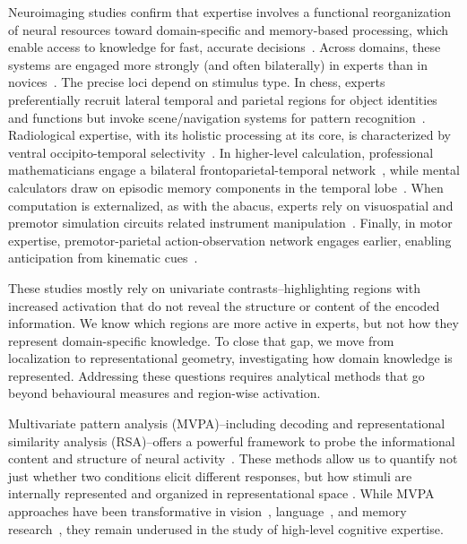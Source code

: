 \documentclass[preprint,12pt]{elsarticle}
\begin{document}
Neuroimaging studies confirm that expertise involves a functional reorganization of neural resources toward domain-specific and memory-based processing, which enable access to knowledge for fast, accurate decisions~\cite{bilalic2017neuroscience,williams2025neural,guida2013functional}. Across domains, these systems are engaged more strongly (and often bilaterally) in experts than in novices~\cite{bilalic2018double}. The precise loci depend on stimulus type. In chess, experts preferentially recruit lateral temporal and parietal regions for object identities and functions but invoke scene/navigation systems for pattern recognition~\cite{krawczyk2011neural,bilalic_mechanisms_2010,bilalic2011takes,bilalic2012expertise,bartlett_expertise_2013,langner2019network}. Radiological expertise, with its holistic processing at its core, is characterized by ventral occipito-temporal selectivity~\cite{harley2009engagement,bilalic_revisiting_2016,kok2021holistic,ouellette2020functional}. In higher-level calculation, professional mathematicians engage a bilateral frontoparietal-temporal network~\cite{amalric2016origins,jeon2017does}, while mental calculators draw on episodic memory components in the temporal lobe~\cite{pesenti2001mental}. When computation is externalized, as with the abacus, experts rely on visuospatial and premotor simulation circuits related instrument manipulation~\cite{tanaka2002superior,hanakawa2003neural}. Finally, in motor expertise, premotor-parietal action-observation network engages earlier, enabling anticipation from kinematic cues~\cite{aglioti2008action}. 

These studies mostly rely on univariate contrasts--highlighting regions with increased activation that do not reveal the structure or content of the encoded information. We know which regions are more active in experts, but not how they represent domain-specific knowledge. To close that gap, we move from localization to representational geometry, investigating how domain knowledge is represented. Addressing these questions requires analytical methods that go beyond behavioural measures and region-wise activation. 

Multivariate pattern analysis (MVPA)--including decoding and representational similarity analysis (RSA)--offers a powerful framework to probe the informational content and structure of neural activity~\cite{Kriegeskorte2008, Kriegeskorte2013}. These methods allow us to quantify not just whether two conditions elicit different responses, but how stimuli are internally represented and organized in representational space  \cite{bracci2023understanding, Kriegeskorte2008, contier2024distributed}. While MVPA approaches have been transformative in vision~\cite{haxby2001distributed,Kriegeskorte2008,kamitani2005decoding}, language~\cite{mitchell2008predicting,huth2016natural}, and memory research~\cite{polyn2005category,xue2010greater}, they remain underused in the study of high-level cognitive expertise.
\end{document}
